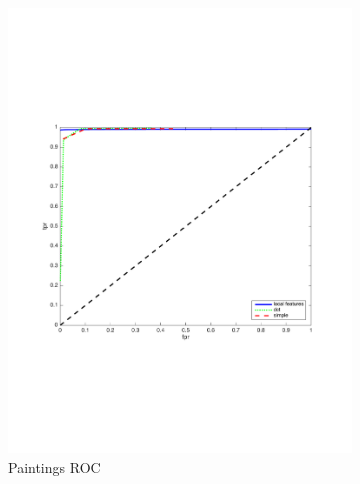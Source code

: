 \documentclass[english,12pt,a4paper,pdftex,elec,utf8, table]{aaltothesis}
\begin{document}
\begin{figure}[htb]
  \begin{center}
  \begin{subfigure}[b]{0.49\textwidth}
    \includegraphics[width=\textwidth]{figures/53scaleROC.pdf}
    \caption{Paintings ROC}
    \label{53roc}
  \end{subfigure}
  \begin{subfigure}[b]{0.49\textwidth}

\end{subfigure}
\end{center}
\end{figure}
\end{document}
